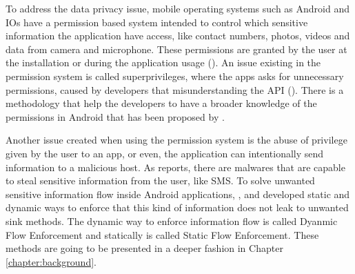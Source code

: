 To address the data privacy issue, mobile operating systems such as Android and IOs have a permission based system intended to control which sensitive information the application have access, like contact numbers, photos, videos and data from camera and microphone. These permissions are granted by the user at the installation or during the application usage (\cite{androidpermissions}). An issue existing in the permission system is called superprivileges, where the apps asks for unnecessary permissions, caused by developers that misunderstanding the API (\cite{felt2011android}). There is a methodology that help the developers to have a broader knowledge of the permissions in Android that has been proposed by \cite{barrera2010methodology}.

Another issue created when using the permission system is the abuse of privilege given by the user to an app, or even, the application can intentionally send information to a malicious host. As \cite{jiang2012dissecting} reports, there are malwares that are capable to steal sensitive information from the user, like SMS. To solve unwanted sensitive information flow inside Android applications, \cite{arzt2014flowdroid}, \cite{wei2014amandroid} and \cite{gordon2015information} developed static and dynamic ways to enforce that this kind of information does not leak to unwanted sink methods. The dynamic way to enforce information flow is called Dyanmic Flow Enforcement and statically is called Static Flow Enforcement. These methods are going to be presented in a deeper fashion in Chapter \ref{chapter:background}.
